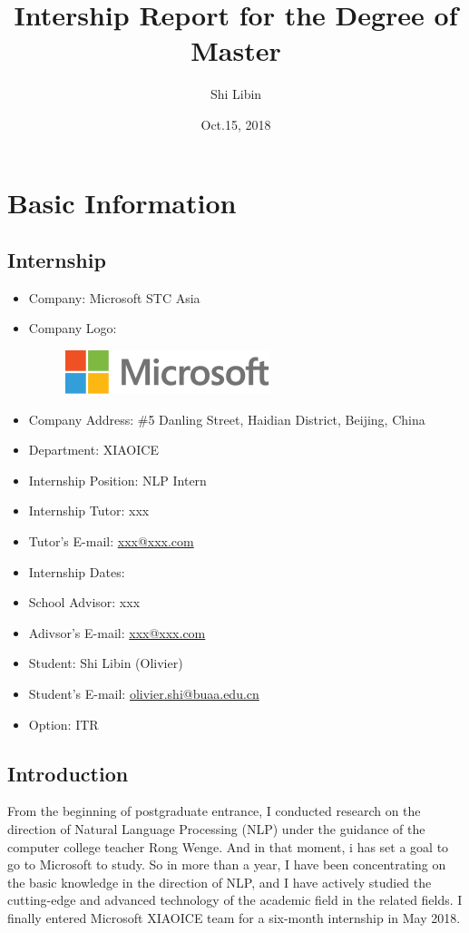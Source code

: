 \documentclass[12pt,a4paper]{article}
\title{Intership Report for the Degree of Master}
\author{Shi Libin}
\date{Oct.15, 2018}
\begin{document}
\maketitle
\newpage
\tableofcontents
\newpage

\section{Basic Information}

\subsection{Internship}
\begin{itemize}
  \item Company: Microsoft STC Asia
  \item Company Logo: 
  \begin{figure}[!h]
    \centering
    \includegraphics[width=0.5 \linewidth]{figures/logo.png}
  \end{figure}
  \item Company Address: \#5 Danling Street, Haidian District, Beijing, China
  \item Department: XIAOICE
  \item Internship Position: NLP Intern
  \item Internship Tutor: xxx
  \item Tutor's E-mail: \href{xxx@xxx.com}{xxx@xxx.com}
  \item Internship Dates: 
  \item School Advisor: xxx
  \item Adivsor's E-mail: \href{xxx@xxx.com}{xxx@xxx.com}
  \item Student: Shi Libin (Olivier)
  \item Student's E-mail: \href{olivier.shi@buaa.edu.cn}{olivier.shi@buaa.edu.cn}
  \item Option: ITR
\end{itemize}

\subsection{Introduction}

From the beginning of postgraduate entrance, I conducted research on the direction of Natural Language Processing (NLP) under the guidance of the computer college teacher Rong Wenge. And in that moment, i has set a goal to go to Microsoft to study. So in more than a year, I have been concentrating on the basic knowledge in the direction of NLP, and I have actively studied the cutting-edge and advanced technology of the academic field in the related fields. I finally entered Microsoft XIAOICE team for a six-month internship in May 2018.
\end{document}
